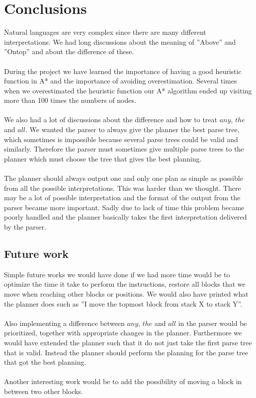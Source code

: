\chapter{Conclusions}
Natural languages are very complex since there are many different
interpretations. We had long discussions about the meaning of ''Above'' and
''Ontop'' and about the difference of these.  
\\\\
During the project we have learned the importance of having a good heuristic
function in A* and the importance of avoiding overestimation.  Several times
when we overestimated the heuristic function our A* algorithm ended up visiting
more than 100 times the numbers of nodes. 
\\\\
We also had a lot of discussions about the difference and how to treat $any$,
$the$ and $all$. We wanted the parser to always give the planner the best parse
tree, which sometimes is impossible because several parse trees could be valid
and similarly. Therefore the parser must sometimes give multiple parse trees to
the planner which must choose the tree that gives the best planning.
\\\\
The planner should always output one and only one plan as simple as
possible from all the possible interpretations. This was harder than we thought. 
There may be a lot of possible interpretation and the format of the
output from the parser became more important. Sadly due to lack of time this
problem became poorly handled and the planner basically takes the first
interpretation delivered by the parser. 
\section{Future work}
Simple future works we would have done if we had more time would be to optimize
the time it take to perform the instructions, restore all blocks that we move
when reaching other blocks or positions. We would also have printed what the
planner does such as ''I move the topmost block from stack X to stack Y''.
\\\\
Also implementing a difference between $any$, $the$ and $all$ in the parser
would be prioritized, together with appropriate changes in the planner.
Furthermore we would have extended the planner such that it do not just take the
first parse tree that is valid. Instead the planner should perform the planning
for the parse tree that got the best planning. 
\\\\
Another interesting work would be to add the possibility of moving a block
in between two other blocks. 
